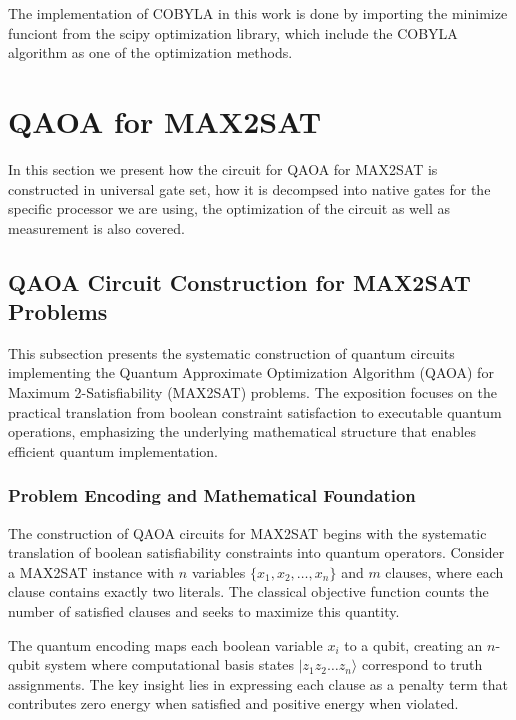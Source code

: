 \documentclass[%
 reprint,
 amsmath,amssymb,
 aps,
]{revtex4-2}
\begin{document}
The implementation of COBYLA in this work is done by importing the minimize funciont from the scipy optimization library, which include the COBYLA algorithm as one of the optimization methods.

\section{QAOA for MAX2SAT}
\label{sec:qaoa}
In this section we present how the circuit for QAOA for MAX2SAT is constructed in universal gate set, how it is decompsed into native gates for the specific processor we are using, the optimization of the circuit as well as measurement is also covered.

\subsection{QAOA Circuit Construction for MAX2SAT Problems}
\label{subsec:qaoa_circuits}

This subsection presents the systematic construction of quantum circuits implementing the Quantum Approximate Optimization Algorithm (QAOA) for Maximum 2-Satisfiability (MAX2SAT) problems. The exposition focuses on the practical translation from boolean constraint satisfaction to executable quantum operations, emphasizing the underlying mathematical structure that enables efficient quantum implementation.

\subsubsection{Problem Encoding and Mathematical Foundation}
\label{subsubsec:encoding_foundation}

The construction of QAOA circuits for MAX2SAT begins with the systematic translation of boolean satisfiability constraints into quantum operators. Consider a MAX2SAT instance with $n$ variables $\{x_1, x_2, \ldots, x_n\}$ and $m$ clauses, where each clause contains exactly two literals. The classical objective function counts the number of satisfied clauses and seeks to maximize this quantity.

The quantum encoding maps each boolean variable $x_i$ to a qubit, creating an $n$-qubit system where computational basis states $|z_1z_2\ldots z_n\rangle$ correspond to truth assignments. The key insight lies in expressing each clause as a penalty term that contributes zero energy when satisfied and positive energy when violated.
\end{document}

